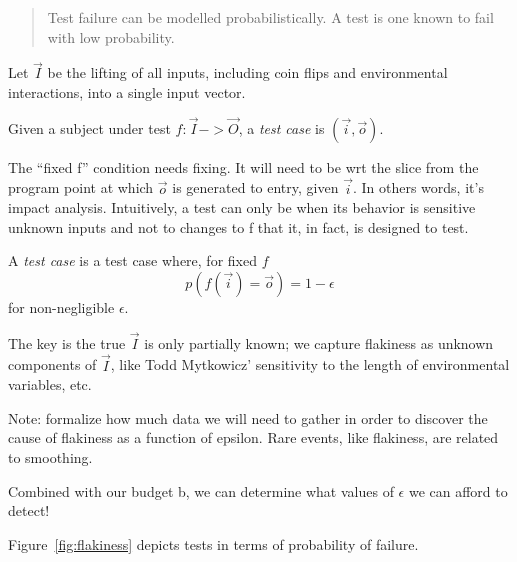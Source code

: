 \begin{quote}
	Test failure can be modelled probabilistically. A \flaky{} test is one known to fail with low probability.
\end{quote}

\begin{defn}\label{def:flaky_test}
	Let $\vec{I}$ be the lifting of all inputs, including coin flips and environmental interactions, into a single input vector.

	Given a subject under test $f: \vec{I} -> \vec{O}$, a \emph{test case} is $(\vec{i},\vec{o})$.

	The “fixed f” condition needs fixing. It will need to be wrt the slice from the program point at which $\vec{o}$ is generated to entry, given $\vec{i}$. In others words, it’s impact analysis. Intuitively, a test can only be \flaky{} when its behavior is sensitive unknown inputs and not to changes to f that it, in fact, is designed to test.

	A \emph{\flaky{} test case} is a test case where, for fixed $f$
	$$p(f(\vec{i}) = \vec{o}) = 1 - \epsilon$$
	for non-negligible $\epsilon$.

	The key is the true $\vec{I}$ is only partially known;  we capture flakiness as unknown components of $\vec{I}$, like Todd Mytkowicz’ sensitivity to the length of environmental variables, etc.

	Note: formalize how much data we will need to gather in order to discover the cause of flakiness as a function of epsilon. Rare events, like flakiness, are related to smoothing.

	Combined with our budget b, we can determine what values of $\epsilon$ we can afford to detect!
\end{defn}

Figure~\ref{fig:flakiness} depicts \flaky{} tests in terms of probability of failure.

